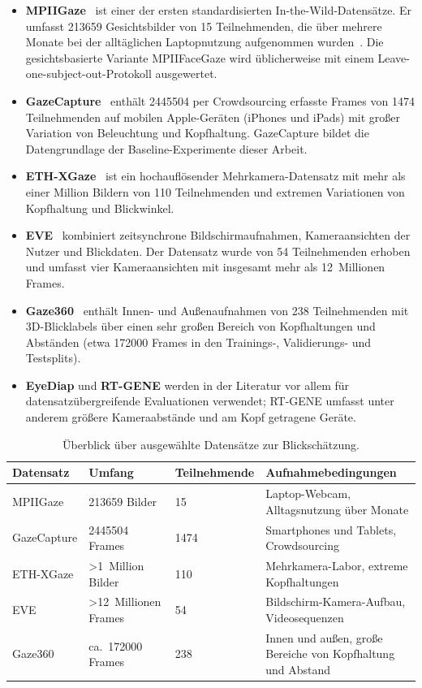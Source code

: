 \documentclass[
  11pt,
  a4paper,
  oneside,
  DIV=12,                 %
  BCOR=8mm,               %
  parskip=half,           %
  headings=normal,
  bibliography=totoc,     %
  listof=totoc            %
]{scrreprt}
\begin{document}
\begin{itemize}
  \item \textbf{MPIIGaze}~\cite{zhang2015mpiigaze} ist einer der ersten standardisierten In-the-Wild-Datensätze. Er umfasst \num{213659} Gesichtsbilder von 15 Teilnehmenden, die über mehrere Monate bei der alltäglichen Laptopnutzung aufgenommen wurden~\cite{zhang2019mpiigaze}. Die gesichtsbasierte Variante MPIIFaceGaze wird üblicherweise mit einem Leave-one-subject-out-Protokoll ausgewertet.
  \item \textbf{GazeCapture}~\cite{krafka2016itracker} enthält \num{2445504} per Crowdsourcing erfasste Frames von \num{1474} Teilnehmenden auf mobilen Apple-Geräten (iPhones und iPads) mit großer Variation von Beleuchtung und Kopfhaltung. GazeCapture bildet die Datengrundlage der Baseline-Experimente dieser Arbeit.
  \item \textbf{ETH-XGaze}~\cite{zhang2020ethxgaze} ist ein hochauflösender Mehrkamera-Datensatz mit mehr als einer Million Bildern von 110 Teilnehmenden und extremen Variationen von Kopfhaltung und Blickwinkel.
  \item \textbf{EVE}~\cite{park2020eve} kombiniert zeitsynchrone Bildschirmaufnahmen, Kameraansichten der Nutzer und Blickdaten. Der Datensatz wurde von 54 Teilnehmenden erhoben und umfasst vier Kameraansichten mit insgesamt mehr als 12~Millionen Frames.
  \item \textbf{Gaze360}~\cite{kellnhofer2019gaze360} enthält Innen- und Außenaufnahmen von 238 Teilnehmenden mit 3D-Blicklabels über einen sehr großen Bereich von Kopfhaltungen und Abständen (etwa \num{172000} Frames in den Trainings-, Validierungs- und Testsplits).
  \item \textbf{EyeDiap} und \textbf{RT-GENE} werden in der Literatur vor allem für datensatzübergreifende Evaluationen verwendet; RT-GENE umfasst unter anderem größere Kameraabstände und am Kopf getragene Geräte.
\end{itemize}

\begin{table}[htbp]
  \centering
  \small
  \caption{Überblick über ausgewählte Datensätze zur Blickschätzung.}
  \label{tab:datensaetze}
  \begin{tabularx}{\textwidth}{L{2.4cm} L{2.6cm} L{2.2cm} Y}
    \toprule
    \textbf{Datensatz} & \textbf{Umfang} & \textbf{Teilnehmende} & \textbf{Aufnahmebedingungen} \\
    \midrule
    MPIIGaze      & \num{213659} Bilder & 15 & Laptop-Webcam, Alltagsnutzung über Monate \\
    GazeCapture   & \num{2445504} Frames & \num{1474} & Smartphones und Tablets, Crowdsourcing \\
    ETH-XGaze     & >1~Million Bilder & 110 & Mehrkamera-Labor, extreme Kopfhaltungen \\
    EVE           & >12~Millionen Frames & 54 & Bildschirm-Kamera-Aufbau, Videosequenzen \\
    Gaze360       & ca.\ \num{172000} Frames & 238 & Innen und außen, große Bereiche von Kopfhaltung und Abstand \\
    \bottomrule
  \end{tabularx}
\end{table}
\end{document}
